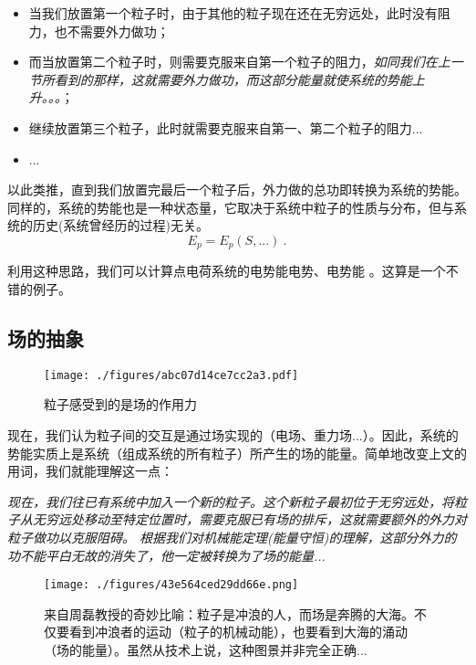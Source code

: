 \begin{itemize}
\item 当我们放置第一个粒子时，由于其他的粒子现在还在无穷远处，此时没有阻力，也不需要外力做功；
\item 而当放置第二个粒子时，则需要克服来自第一个粒子的阻力，\textsl{如同我们在上一节所看到的那样，这就需要外力做功，而这部分能量就使系统的势能上升。。。}；
\item 继续放置第三个粒子，此时就需要克服来自第一、第二个粒子的阻力...
\item ...
\end{itemize}
以此类推，直到我们放置完最后一个粒子后，外力做的总功即转换为系统的势能。
同样的，系统的势能也是一种状态量，它取决于系统中粒子的性质与分布，但与系统的历史(系统曾经历的过程)无关。
$$E_p=E_p(S,...)~.$$

利用这种思路，我们可以计算点电荷系统的电势能电势、电势能 。这算是一个不错的例子。

\subsection{场的抽象}
\begin{figure}[ht]
\centering
\texttt{[image: ./figures/abc07d14ce7cc2a3.pdf]}
\caption{粒子感受到的是场的作用力} \label{fig_POTENT_3}
\end{figure}
现在，我们认为粒子间的交互是通过场实现的（电场、重力场...）。因此，系统的势能实质上是系统（组成系统的所有粒子）所产生的场的能量。简单地改变上文的用词，我们就能理解这一点：

\textsl{现在，我们往已有系统中加入一个新的粒子。这个新粒子最初位于无穷远处，将粒子从无穷远处移动至特定位置时，需要克服已有场的排斥，这就需要额外的外力对粒子做功以克服阻碍。 根据我们对机械能定理(能量守恒)的理解，这部分外力的功不能平白无故的消失了，他一定被转换为了场的能量...}

\begin{figure}[ht]
\centering
\texttt{[image: ./figures/43e564ced29dd66e.png]}
\caption{来自周磊教授的奇妙比喻：粒子是冲浪的人，而场是奔腾的大海。不仅要看到冲浪者的运动（粒子的机械动能），也要看到大海的涌动（场的能量）。虽然从技术上说，这种图景并非完全正确...} \label{fig_POTENT_5}
\end{figure}
